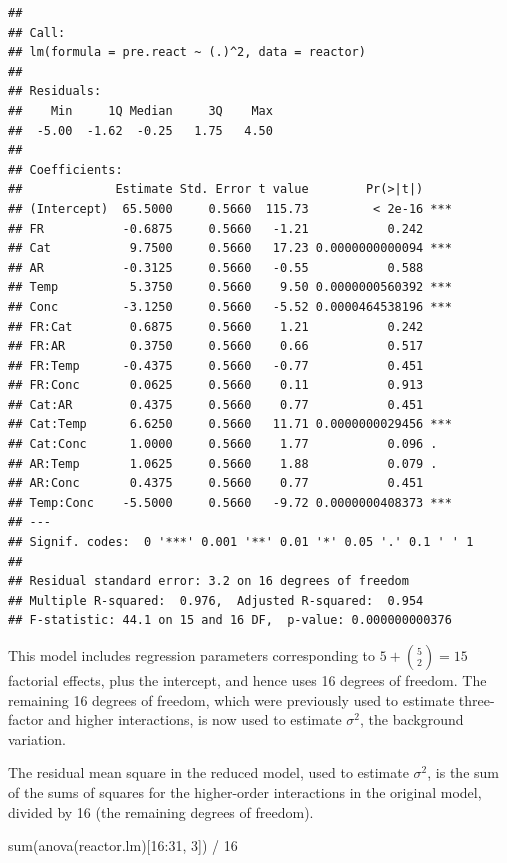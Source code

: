 \documentclass[
]{book}
\newenvironment{Shaded}{\begin{snugshade}}{\end{snugshade}}
\newcommand{\DecValTok}[1]{\textcolor[rgb]{0.00,0.00,0.81}{#1}}
\newcommand{\FunctionTok}[1]{\textcolor[rgb]{0.00,0.00,0.00}{#1}}
\newcommand{\NormalTok}[1]{#1}
\newcommand{\SpecialCharTok}[1]{\textcolor[rgb]{0.00,0.00,0.00}{#1}}
\theoremstyle{definition}
\theoremstyle{definition}
\theoremstyle{definition}
\theoremstyle{definition}
\theoremstyle{remark}
\begin{document}
\begin{verbatim}
## 
## Call:
## lm(formula = pre.react ~ (.)^2, data = reactor)
## 
## Residuals:
##    Min     1Q Median     3Q    Max 
##  -5.00  -1.62  -0.25   1.75   4.50 
## 
## Coefficients:
##             Estimate Std. Error t value        Pr(>|t|)    
## (Intercept)  65.5000     0.5660  115.73         < 2e-16 ***
## FR           -0.6875     0.5660   -1.21           0.242    
## Cat           9.7500     0.5660   17.23 0.0000000000094 ***
## AR           -0.3125     0.5660   -0.55           0.588    
## Temp          5.3750     0.5660    9.50 0.0000000560392 ***
## Conc         -3.1250     0.5660   -5.52 0.0000464538196 ***
## FR:Cat        0.6875     0.5660    1.21           0.242    
## FR:AR         0.3750     0.5660    0.66           0.517    
## FR:Temp      -0.4375     0.5660   -0.77           0.451    
## FR:Conc       0.0625     0.5660    0.11           0.913    
## Cat:AR        0.4375     0.5660    0.77           0.451    
## Cat:Temp      6.6250     0.5660   11.71 0.0000000029456 ***
## Cat:Conc      1.0000     0.5660    1.77           0.096 .  
## AR:Temp       1.0625     0.5660    1.88           0.079 .  
## AR:Conc       0.4375     0.5660    0.77           0.451    
## Temp:Conc    -5.5000     0.5660   -9.72 0.0000000408373 ***
## ---
## Signif. codes:  0 '***' 0.001 '**' 0.01 '*' 0.05 '.' 0.1 ' ' 1
## 
## Residual standard error: 3.2 on 16 degrees of freedom
## Multiple R-squared:  0.976,  Adjusted R-squared:  0.954 
## F-statistic: 44.1 on 15 and 16 DF,  p-value: 0.000000000376
\end{verbatim}

This model includes regression parameters corresponding to \(5 + {5 \choose 2} = 15\) factorial effects, plus the intercept, and hence uses 16 degrees of freedom. The remaining 16 degrees of freedom, which were previously used to estimate three-factor and higher interactions, is now used to estimate \(\sigma^2\), the background variation.

The residual mean square in the reduced model, used to estimate \(\sigma^2\), is the sum of the sums of squares for the higher-order interactions in the original model, divided by 16 (the remaining degrees of freedom).

\begin{Shaded}
\begin{Highlighting}[]
\FunctionTok{sum}\NormalTok{(}\FunctionTok{anova}\NormalTok{(reactor.lm)[}\DecValTok{16}\SpecialCharTok{:}\DecValTok{31}\NormalTok{, }\DecValTok{3}\NormalTok{]) }\SpecialCharTok{/} \DecValTok{16}
\end{Highlighting}
\end{Shaded}
\end{document}
